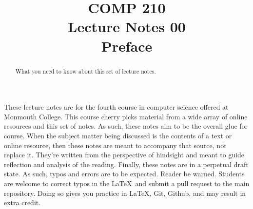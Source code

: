 \documentclass[nobib]{tufte-handout}
\title{COMP 210 \\ Lecture Notes 00 \\ Preface}
\begin{document}
\maketitle

\begin{abstract}
What you need to know about this set of lecture notes.
\end{abstract}

These lecture notes are for the fourth course in computer science offered at Monmouth College.  This course cherry picks material from a wide array of online resources and this set of notes.  As such, these notes aim to be the overall glue for course.  When the subject matter being discussed is the contents of a text or online resource, then these notes are meant to accompany that source, not replace it.  They're written from the perspective of hindsight and meant to guide reflection and analysis of the reading.
Finally, these notes are in a perpetual draft state. As such, typos and errors are to be expected. Reader be warned. Students are welcome to correct typos in the \LaTeX\ and submit a pull request to the main repository. Doing so gives you practice in \LaTeX, Git, Github, and may result in extra credit.
\end{document}
